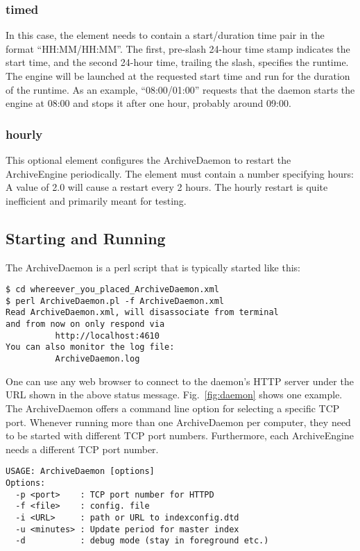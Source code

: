 \subsubsection{timed}
In this case, the element needs to contain a start/duration time pair
in the format ``HH:MM/HH:MM''. The first, pre-slash 24-hour time stamp
indicates the start time, and the second 24-hour time, trailing the
slash, specifies the runtime. The engine will be launched at the
requested start time and run for the duration of the runtime. As an
example, ``08:00/01:00'' requests that the daemon starts the engine at
08:00 and stops it after one hour, probably around 09:00.

\subsubsection{hourly}
This optional element configures the ArchiveDaemon to restart the
ArchiveEngine periodically. The element must contain a number
specifying hours: A value of 2.0 will cause a restart every 2
hours. The hourly restart is quite inefficient and primarily meant for testing.

\subsection{Starting and Running}
The ArchiveDaemon is a perl script that is typically started like this:

\begin{lstlisting}[keywordstyle=\sffamily]
$ cd whereever_you_placed_ArchiveDaemon.xml
$ perl ArchiveDaemon.pl -f ArchiveDaemon.xml
Read ArchiveDaemon.xml, will disassociate from terminal
and from now on only respond via
          http://localhost:4610
You can also monitor the log file:
          ArchiveDaemon.log
\end{lstlisting}

\noindent One can use any web browser to connect to the daemon's HTTP server
under the URL shown in the above status message. Fig.~\ref{fig:daemon}
shows one example. The ArchiveDaemon offers a command line option for
selecting a specific TCP port.
Whenever running more than one ArchiveDaemon per computer, they
need to be started with different TCP port numbers. Furthermore, each
ArchiveEngine needs a different TCP port number.
\begin{lstlisting}[keywordstyle=\sffamily]
USAGE: ArchiveDaemon [options] 
Options:
  -p <port>    : TCP port number for HTTPD
  -f <file>    : config. file
  -i <URL>     : path or URL to indexconfig.dtd
  -u <minutes> : Update period for master index
  -d           : debug mode (stay in foreground etc.)
\end{lstlisting}


